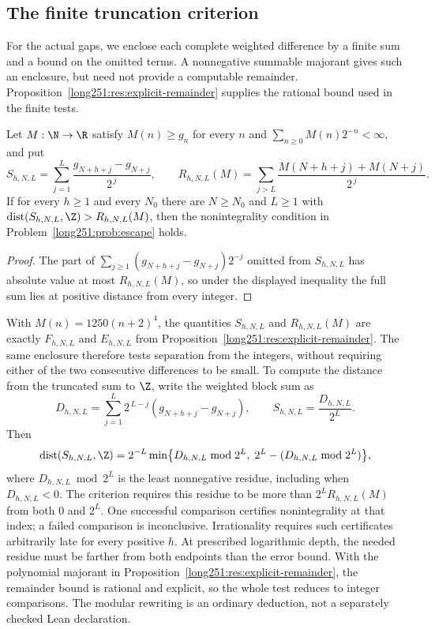 \subsection{The finite truncation criterion}\label{long251:sec:xr-truncation}

For the actual gaps, we enclose each complete weighted difference by a
finite sum and a bound on the omitted terms.  A nonnegative summable
majorant gives such an enclosure, but need not provide a computable
remainder.  Proposition~\ref{long251:res:explicit-remainder} supplies
the rational bound used in the finite tests.

\begin{samepage}
\begin{proposition}\label{long251:xr:truncation}
Let $M:\N\to\R$ satisfy $M(n)\ge g_n$ for every $n$ and
$\sum_{n\ge0}M(n)2^{-n}<\infty$, and put
\[
 S_{h,N,L}=\sum_{j=1}^{L}\frac{g_{N+h+j}-g_{N+j}}{2^{\,j}},\qquad
 R_{h,N,L}(M)=\sum_{j>L}\frac{M(N+h+j)+M(N+j)}{2^{\,j}} .
\]
If for every $h\ge1$ and every $N_0$ there are $N\ge N_0$ and $L\ge1$ with
$\operatorname{dist}(S_{h,N,L},\Z)>R_{h,N,L}(M)$, then the nonintegrality
condition in Problem~\ref{long251:prob:escape} holds.
\end{proposition}
\end{samepage}

\begin{proof}
The part of $\sum_{j\ge1}(g_{N+h+j}-g_{N+j})2^{-j}$ omitted from $S_{h,N,L}$
has absolute value at most $R_{h,N,L}(M)$, so under the displayed inequality
the full sum lies at positive distance from every integer.
\end{proof}

With $M(n)=1250(n+2)^4$, the quantities $S_{h,N,L}$ and
$R_{h,N,L}(M)$ are exactly $F_{h,N,L}$ and $E_{h,N,L}$ from
Proposition~\ref{long251:res:explicit-remainder}.  The same enclosure
therefore tests separation from the integers, without requiring either
of the two consecutive differences to be small.  To compute the distance
from the truncated sum to $\Z$, write the weighted block sum as
\[
 D_{h,N,L}=\sum_{j=1}^{L}2^{\,L-j}(g_{N+h+j}-g_{N+j}),
 \qquad S_{h,N,L}=\frac{D_{h,N,L}}{2^{L}}.
\]
Then
\[
 \operatorname{dist}(S_{h,N,L},\Z)
 =2^{-L}\min\bigl\{D_{h,N,L}\bmod2^{L},\;
 2^{L}-(D_{h,N,L}\bmod2^{L})\bigr\},
\]
where $D_{h,N,L}\bmod2^{L}$ is the least nonnegative residue, including when
$D_{h,N,L}<0$.  The criterion requires this residue to be more than
$2^LR_{h,N,L}(M)$ from both $0$ and $2^L$.  One successful comparison certifies nonintegrality at that index;
a failed comparison is inconclusive.  Irrationality requires such
certificates arbitrarily late for every positive $h$.  At prescribed
logarithmic depth, the needed residue must be farther from both endpoints
than the error bound.  With the polynomial majorant in
Proposition~\ref{long251:res:explicit-remainder}, the remainder bound is
rational and explicit, so the whole test reduces to integer comparisons.
The modular rewriting is an ordinary deduction, not a separately checked
Lean declaration.

